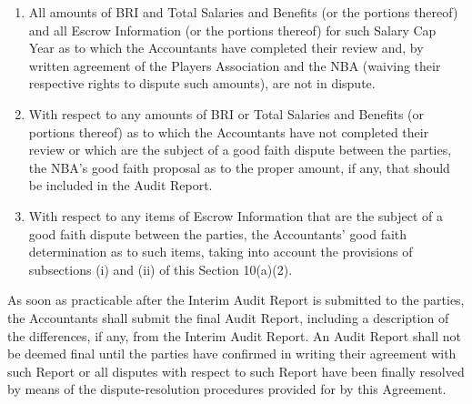 \documentclass[
]{book}
\providecommand{\tightlist}{%
  \setlength{\itemsep}{0pt}\setlength{\parskip}{0pt}}
\begin{document}
\begin{enumerate}
\begin{enumerate}
    \begin{enumerate}
    \def\labelenumiii{(\roman{enumiii})}
    \tightlist
    \item
      All amounts of BRI and Total Salaries and Benefits (or the portions thereof) and all Escrow Information (or the portions thereof) for such Salary Cap Year as to which the Accountants have completed their review and, by written agreement of the Players Association and the NBA (waiving their respective rights to dispute such amounts), are not in dispute.
    \item
      With respect to any amounts of BRI or Total Salaries and Benefits (or portions thereof) as to which the Accountants have not completed their review or which are the subject of a good faith dispute between the parties, the NBA's good faith proposal as to the proper amount, if any, that should be included in the Audit Report.
    \item
      With respect to any items of Escrow Information that are the subject of a good faith dispute between the parties, the Accountants' good faith determination as to such items, taking into account the provisions of subsections (i) and (ii) of this Section 10(a)(2).
    \end{enumerate}
  \end{enumerate}

  As soon as practicable after the Interim Audit Report is submitted to the parties, the Accountants shall submit the final Audit Report, including a description of the differences, if any, from the Interim Audit Report. An Audit Report shall not be deemed final until the parties have confirmed in writing their agreement with such Report or all disputes with respect to such Report have been finally resolved by means of the dispute-resolution procedures provided for by this Agreement.


\end{enumerate}
\end{document}
